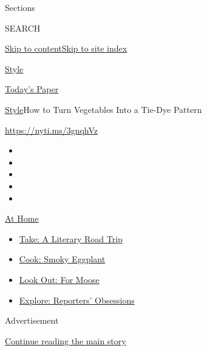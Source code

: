 Sections

SEARCH

\protect\hyperlink{site-content}{Skip to
content}\protect\hyperlink{site-index}{Skip to site index}

\href{https://www.nytimes.com/section/style}{Style}

\href{https://myaccount.nytimes.com/auth/login?response_type=cookie\&client_id=vi}{}

\href{https://www.nytimes.com/section/todayspaper}{Today's Paper}

\href{/section/style}{Style}\textbar{}How to Turn Vegetables Into a
Tie-Dye Pattern

\url{https://nyti.ms/3gnqhVz}

\begin{itemize}
\item
\item
\item
\item
\item
\end{itemize}

\href{https://www.nytimes.com/spotlight/at-home?action=click\&pgtype=Article\&state=default\&region=TOP_BANNER\&context=at_home_menu}{At
Home}

\begin{itemize}
\tightlist
\item
  \href{https://www.nytimes.com/2020/07/28/books/time-for-a-literary-road-trip.html?action=click\&pgtype=Article\&state=default\&region=TOP_BANNER\&context=at_home_menu}{Take:
  A Literary Road Trip}
\item
  \href{https://www.nytimes.com/2020/07/29/magazine/bored-with-your-home-cooking-some-smoky-eggplant-will-fix-that.html?action=click\&pgtype=Article\&state=default\&region=TOP_BANNER\&context=at_home_menu}{Cook:
  Smoky Eggplant}
\item
  \href{https://www.nytimes.com/2020/07/27/travel/moose-michigan-isle-royale.html?action=click\&pgtype=Article\&state=default\&region=TOP_BANNER\&context=at_home_menu}{Look
  Out: For Moose}
\item
  \href{https://www.nytimes.com/interactive/2020/at-home/even-more-reporters-editors-diaries-lists-recommendations.html?action=click\&pgtype=Article\&state=default\&region=TOP_BANNER\&context=at_home_menu}{Explore:
  Reporters' Obsessions}
\end{itemize}

Advertisement

\protect\hyperlink{after-top}{Continue reading the main story}

